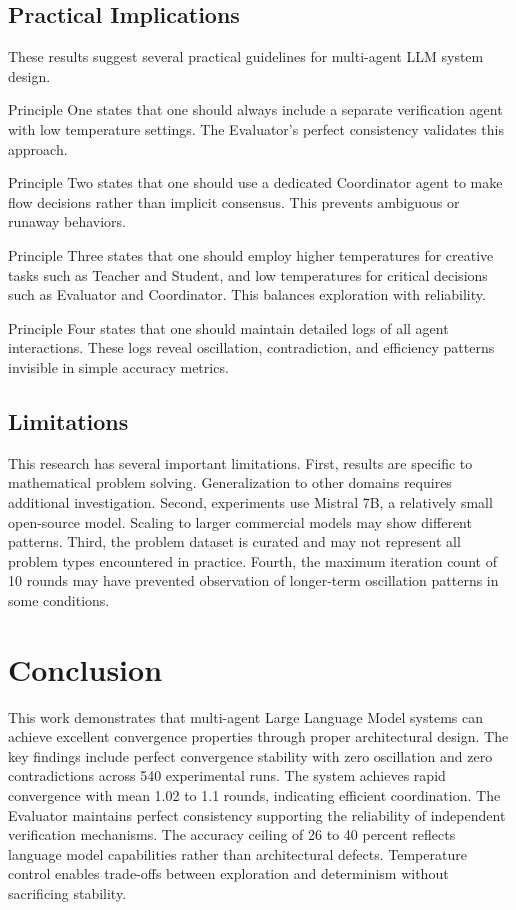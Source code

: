 \documentclass[conference]{IEEEtran}
\begin{document}
\subsection{Practical Implications}

These results suggest several practical guidelines for multi-agent LLM system design.

Principle One states that one should always include a separate verification agent with low temperature settings. The Evaluator's perfect consistency validates this approach.

Principle Two states that one should use a dedicated Coordinator agent to make flow decisions rather than implicit consensus. This prevents ambiguous or runaway behaviors.

Principle Three states that one should employ higher temperatures for creative tasks such as Teacher and Student, and low temperatures for critical decisions such as Evaluator and Coordinator. This balances exploration with reliability.

Principle Four states that one should maintain detailed logs of all agent interactions. These logs reveal oscillation, contradiction, and efficiency patterns invisible in simple accuracy metrics.

\subsection{Limitations}

This research has several important limitations. First, results are specific to mathematical problem solving. Generalization to other domains requires additional investigation. Second, experiments use Mistral 7B, a relatively small open-source model. Scaling to larger commercial models may show different patterns. Third, the problem dataset is curated and may not represent all problem types encountered in practice. Fourth, the maximum iteration count of 10 rounds may have prevented observation of longer-term oscillation patterns in some conditions.

\section{Conclusion}

This work demonstrates that multi-agent Large Language Model systems can achieve excellent convergence properties through proper architectural design. The key findings include perfect convergence stability with zero oscillation and zero contradictions across 540 experimental runs. The system achieves rapid convergence with mean 1.02 to 1.1 rounds, indicating efficient coordination. The Evaluator maintains perfect consistency supporting the reliability of independent verification mechanisms. The accuracy ceiling of 26 to 40 percent reflects language model capabilities rather than architectural defects. Temperature control enables trade-offs between exploration and determinism without sacrificing stability.
\end{document}
